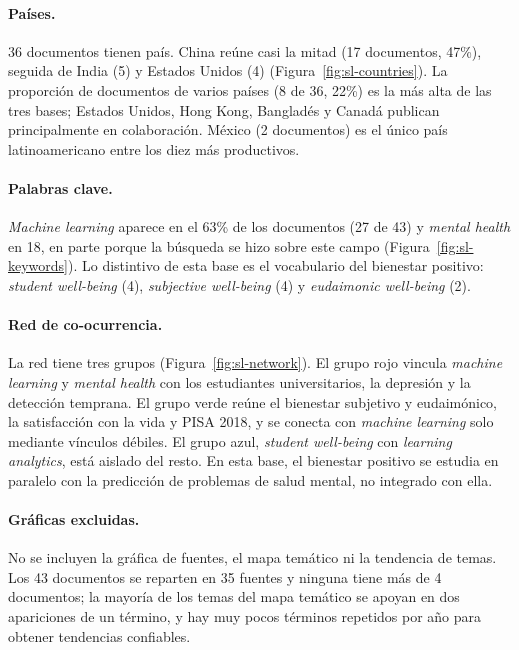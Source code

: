 \documentclass[11pt,a4paper]{article}
\begin{document}
\paragraph{Países.} 36 documentos tienen país. China reúne casi la mitad (17 documentos, 47\%), seguida de India (5) y Estados Unidos (4) (Figura~\ref{fig:sl-countries}). La proporción de documentos de varios países (8 de 36, 22\%) es la más alta de las tres bases; Estados Unidos, Hong Kong, Bangladés y Canadá publican principalmente en colaboración. México (2 documentos) es el único país latinoamericano entre los diez más productivos.

\paragraph{Palabras clave.} \emph{Machine learning} aparece en el 63\% de los documentos (27 de 43) y \emph{mental health} en 18, en parte porque la búsqueda se hizo sobre este campo (Figura~\ref{fig:sl-keywords}). Lo distintivo de esta base es el vocabulario del bienestar positivo: \emph{student well-being} (4), \emph{subjective well-being} (4) y \emph{eudaimonic well-being} (2).

\paragraph{Red de co-ocurrencia.} La red tiene tres grupos (Figura~\ref{fig:sl-network}). El grupo rojo vincula \emph{machine learning} y \emph{mental health} con los estudiantes universitarios, la depresión y la detección temprana. El grupo verde reúne el bienestar subjetivo y eudaimónico, la satisfacción con la vida y PISA 2018, y se conecta con \emph{machine learning} solo mediante vínculos débiles. El grupo azul, \emph{student well-being} con \emph{learning analytics}, está aislado del resto. En esta base, el bienestar positivo se estudia en paralelo con la predicción de problemas de salud mental, no integrado con ella.

\paragraph{Gráficas excluidas.} No se incluyen la gráfica de fuentes, el mapa temático ni la tendencia de temas. Los 43 documentos se reparten en 35 fuentes y ninguna tiene más de 4 documentos; la mayoría de los temas del mapa temático se apoyan en dos apariciones de un término, y hay muy pocos términos repetidos por año para obtener tendencias confiables.
\end{document}
